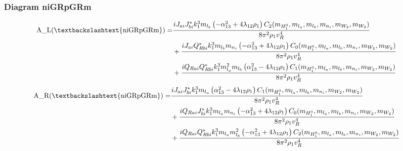 \documentclass{article}
\begin{document}
\subsubsection{Diagram niGRpGRm}
\begin{align*}
\mathtt{\text{A\_L(\textbackslashtext\{niGRpGRm\})}} = & \frac{i J_{ai} J_{bi}^* k_{1}^{3} m_{l_b} \left(- \alpha_{13}^{2} + 4 \lambda_{12} \rho_{1}\right) C_2(m_{H_1^0}, m_{l_a}, m_{l_b}, m_{n_i}, m_{W_2}, m_{W_2})}{8 \pi^{2} \rho_{1} v_{R}^{4}} \\
& + \frac{i J_{ai} Q_{Rbi}^* k_{1}^{3} m_{l_b} m_{n_i} \left(- \alpha_{13}^{2} + 4 \lambda_{12} \rho_{1}\right) C_0(m_{H_1^0}, m_{l_a}, m_{l_b}, m_{n_i}, m_{W_2}, m_{W_2})}{8 \pi^{2} \rho_{1} v_{R}^{4}} \\
& + \frac{i Q_{Rai} Q_{Rbi}^* k_{1}^{3} m_{l_a}^{2} m_{l_b} \left(\alpha_{13}^{2} - 4 \lambda_{12} \rho_{1}\right) C_1(m_{H_1^0}, m_{l_a}, m_{l_b}, m_{n_i}, m_{W_2}, m_{W_2})}{8 \pi^{2} \rho_{1} v_{R}^{4}} 
\end{align*}
\begin{align*}
\mathtt{\text{A\_R(\textbackslashtext\{niGRpGRm\})}} = & \frac{i J_{ai} J_{bi}^* k_{1}^{3} m_{l_a} \left(\alpha_{13}^{2} - 4 \lambda_{12} \rho_{1}\right) C_1(m_{H_1^0}, m_{l_a}, m_{l_b}, m_{n_i}, m_{W_2}, m_{W_2})}{8 \pi^{2} \rho_{1} v_{R}^{4}} \\
& + \frac{i Q_{Rai} J_{bi}^* k_{1}^{3} m_{l_a} m_{n_i} \left(- \alpha_{13}^{2} + 4 \lambda_{12} \rho_{1}\right) C_0(m_{H_1^0}, m_{l_a}, m_{l_b}, m_{n_i}, m_{W_2}, m_{W_2})}{8 \pi^{2} \rho_{1} v_{R}^{4}} \\
& + \frac{i Q_{Rai} Q_{Rbi}^* k_{1}^{3} m_{l_a} m_{l_b}^{2} \left(- \alpha_{13}^{2} + 4 \lambda_{12} \rho_{1}\right) C_2(m_{H_1^0}, m_{l_a}, m_{l_b}, m_{n_i}, m_{W_2}, m_{W_2})}{8 \pi^{2} \rho_{1} v_{R}^{4}} 
\end{align*}
\end{document}
